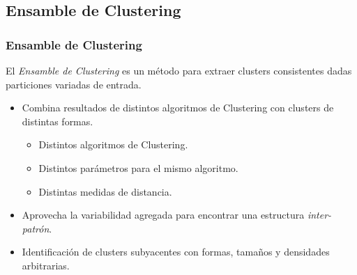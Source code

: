\subsection{Ensamble de Clustering}
\begin{frame}
	\frametitle{Ensamble de Clustering}
	\begin{tcolorbox}[colback=blue!5,colframe=blue!40!black,title=Ensamble de Clustering]
		El \textit{Ensamble de Clustering} es un método para extraer clusters consistentes dadas particiones variadas de entrada.
	\end{tcolorbox}

 	\bigskip

	\begin{itemize}
		\item Combina resultados de distintos algoritmos de Clustering con clusters de distintas formas.
			\begin{itemize}[<*>]
				\item Distintos algoritmos de Clustering.
				\item Distintos parámetros para el mismo algoritmo.
				\item Distintas medidas de distancia.
			\end{itemize}
		\item Aprovecha la variabilidad agregada para encontrar una estructura \textit{inter-patrón}.
		\item Identificación de clusters subyacentes con formas, tamaños y densidades arbitrarias.
	\end{itemize}
\end{frame}


